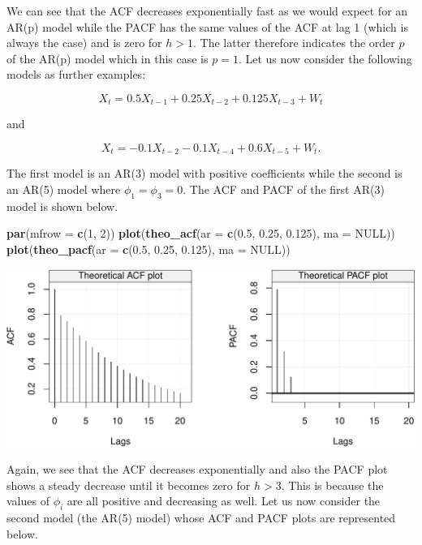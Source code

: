 \documentclass[]{book}
\newenvironment{Shaded}{\begin{snugshade}}{\end{snugshade}}
\newcommand{\DataTypeTok}[1]{\textcolor[rgb]{0.13,0.29,0.53}{#1}}
\newcommand{\DecValTok}[1]{\textcolor[rgb]{0.00,0.00,0.81}{#1}}
\newcommand{\FloatTok}[1]{\textcolor[rgb]{0.00,0.00,0.81}{#1}}
\newcommand{\KeywordTok}[1]{\textcolor[rgb]{0.13,0.29,0.53}{\textbf{#1}}}
\newcommand{\NormalTok}[1]{#1}
\newcommand{\OtherTok}[1]{\textcolor[rgb]{0.56,0.35,0.01}{#1}}
\theoremstyle{definition}
\theoremstyle{definition}
\theoremstyle{definition}
\theoremstyle{remark}
\begin{document}
We can see that the ACF decreases exponentially fast as we would expect
for an AR(p) model while the PACF has the same values of the ACF at lag
1 (which is always the case) and is zero for \(h > 1\). The latter
therefore indicates the order \(p\) of the AR(p) model which in this
case is \(p=1\). Let us now consider the following models as further
examples:

\[X_t = 0.5 X_{t-1} + 0.25 X_{t-2} + 0.125 X_{t-3} + W_t\]

and

\[X_t = -0.1 X_{t-2} -0.1 X_{t-4} + 0.6 X_{t-5} + W_t.\]

The first model is an AR(3) model with positive coefficients while the
second is an AR(5) model where \(\phi_1 = \phi_3 = 0\). The ACF and PACF
of the first AR(3) model is shown below.

\begin{Shaded}
\begin{Highlighting}[]
\KeywordTok{par}\NormalTok{(}\DataTypeTok{mfrow =} \KeywordTok{c}\NormalTok{(}\DecValTok{1}\NormalTok{, }\DecValTok{2}\NormalTok{))}
\KeywordTok{plot}\NormalTok{(}\KeywordTok{theo_acf}\NormalTok{(}\DataTypeTok{ar =} \KeywordTok{c}\NormalTok{(}\FloatTok{0.5}\NormalTok{, }\FloatTok{0.25}\NormalTok{, }\FloatTok{0.125}\NormalTok{), }\DataTypeTok{ma =} \OtherTok{NULL}\NormalTok{))}
\KeywordTok{plot}\NormalTok{(}\KeywordTok{theo_pacf}\NormalTok{(}\DataTypeTok{ar =} \KeywordTok{c}\NormalTok{(}\FloatTok{0.5}\NormalTok{, }\FloatTok{0.25}\NormalTok{, }\FloatTok{0.125}\NormalTok{), }\DataTypeTok{ma =} \OtherTok{NULL}\NormalTok{))}
\end{Highlighting}
\end{Shaded}

\includegraphics{ts_files/figure-latex/unnamed-chunk-43-1.pdf}

Again, we see that the ACF decreases exponentially and also the PACF
plot shows a steady decrease until it becomes zero for \(h > 3\). This
is because the values of \(\phi_i\) are all positive and decreasing as
well. Let us now consider the second model (the AR(5) model) whose ACF
and PACF plots are represented below.
\end{document}
